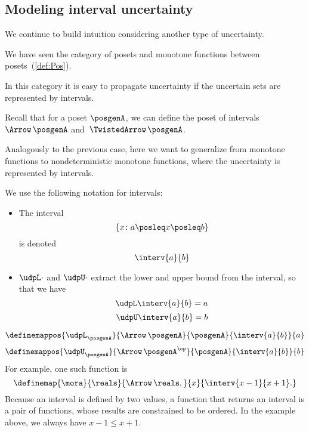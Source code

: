 \subsection{Modeling interval uncertainty}

We continue to build intuition considering another type of uncertainty.

We have seen the category \Pos of posets and monotone functions between posets~(\cref{def:Pos}).

In this category it is easy to propagate uncertainty if the uncertain sets are represented by intervals.

Recall that for a poset $\posgenA$, we can define the poset of intervals~$\Arrow\,\posgenA$
and~$\TwistedArrow\,\posgenA$.

Analogously to the previous case, here we want to generalize from monotone functions to nondeterministic monotone functions, where the uncertainty is represented by intervals.

We use the following notation for intervals:
\begin{itemize}
    \item The interval
          \begin{equation}
              \label{eq:interv-1}
              \{x\colon a \posleq x \posleq b\}
          \end{equation}
          is denoted
          \begin{equation}
              \label{eq:interv-2}
              \interv{a}{b}
          \end{equation}
    \item $\udpL\cdot$ and $\udpU\cdot$ extract the lower and upper bound from the interval, so that we have
          \begin{equation}
              \label{eq:interv-L}
              \udpL \interv{a}{b} = a
          \end{equation}
          \begin{equation}
              \label{eq:interv-U}
              \udpU \interv{a}{b} = b
          \end{equation}
\end{itemize}
%
\begin{equation}
    \label{eq:interv-L-def}
    \definemappos{\udpL_{\posgenA}}{\Arrow\,\posgenA}{\posgenA}%
    {\interv{a}{b}}{ a }
\end{equation}
%
\begin{equation}
    \label{eq:interv-U-def}
    \definemappos{\udpU_{\posgenA}}{\Arrow\,\posgenA^{\op}}{\posgenA}%
    {\interv{a}{b}}{ b }
\end{equation}
%
For example, one such function is
%
\begin{equation}
    \label{eq:interval-func-example}
    \definemap{\mora}{\reals}{\Arrow\,\reals,}%
    {x}{ \interv{x-1}{x+1}.
    }
\end{equation}
Because an interval is defined by two values, a function that returns an interval is a pair of functions, whose results are constrained to be ordered.
In the example above, we always have $x-1\leq x+1$.

